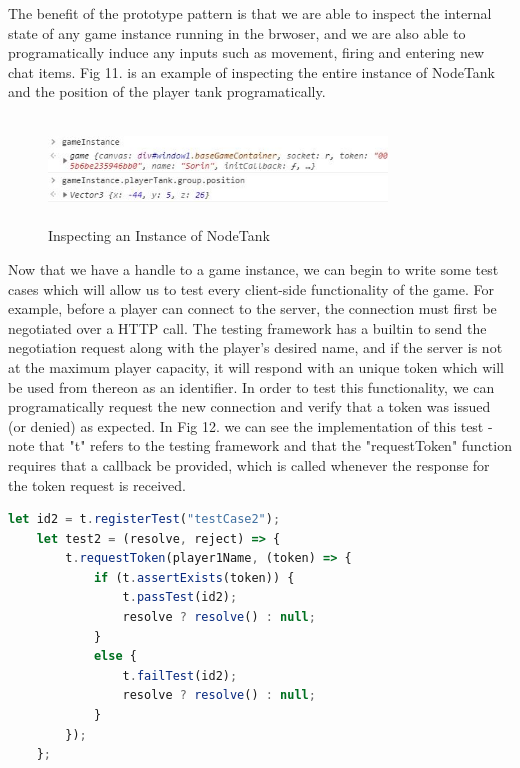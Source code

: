 \documentclass[conference]{IEEEtran}
\begin{document}
The benefit of the prototype pattern is that we are able to inspect the internal state of any game instance running in the brwoser, and we are also able to programatically induce 
any inputs such as movement, firing and entering new chat items. Fig 11. is an example of inspecting the entire instance of NodeTank and the position of the player tank programatically.

\begin{figure}[htbp]
\centerline{\includegraphics [width = 9cm, height = 2.8cm] {GameInspection.jpg}}
\caption{Inspecting an Instance of NodeTank}
\end{figure}

Now that we have a handle to a game instance, we can begin to write some test cases which will allow us to test every client-side functionality of the game. For example, before a player can
connect to the server, the connection must first be negotiated over a HTTP call. The testing framework has a builtin to send the negotiation request along with the player's desired name, and if the 
server is not at the maximum player capacity, it will respond with an unique token which will be used from thereon as an identifier. In order to test this functionality, we can programatically request
the new connection and verify that a token was issued (or denied) as expected. In Fig 12. we can see the implementation of this test - note that "t" refers to the testing framework and that the "requestToken"
function requires that a callback be provided, which is called whenever the response for the token request is received. 

\begin{lstlisting}[language=JavaScript,caption={Snippet of Test Case for Requesting a Token}]
    let id2 = t.registerTest("testCase2");
    let test2 = (resolve, reject) => {
        t.requestToken(player1Name, (token) => {
            if (t.assertExists(token)) {
                t.passTest(id2);
                resolve ? resolve() : null;
            }
            else {
                t.failTest(id2);
                resolve ? resolve() : null;
            }
        });
    };
\end{lstlisting}
\end{document}
